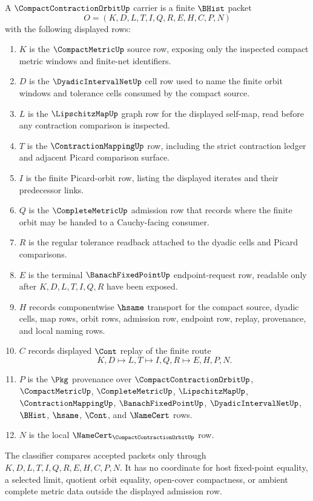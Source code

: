 \begin{definition}
\label{def:compact-contraction-orbit-carrier}
A $\CompactContractionOrbitUp$ carrier is a finite $\BHist$ packet
$$
O=(K,D,L,T,I,Q,R,E,H,C,P,N)
$$
with the following displayed rows:
\begin{enumerate}
\item $K$ is the $\CompactMetricUp$ source row, exposing only the inspected compact metric windows and finite-net identifiers.
\item $D$ is the $\DyadicIntervalNetUp$ cell row used to name the finite orbit windows and tolerance cells consumed by the compact source.
\item $L$ is the $\LipschitzMapUp$ graph row for the displayed self-map, read before any contraction comparison is inspected.
\item $T$ is the $\ContractionMappingUp$ row, including the strict contraction ledger and adjacent Picard comparison surface.
\item $I$ is the finite Picard-orbit row, listing the displayed iterates and their predecessor links.
\item $Q$ is the $\CompleteMetricUp$ admission row that records where the finite orbit may be handed to a Cauchy-facing consumer.
\item $R$ is the regular tolerance readback attached to the dyadic cells and Picard comparisons.
\item $E$ is the terminal $\BanachFixedPointUp$ endpoint-request row, readable only after $K,D,L,T,I,Q,R$ have been exposed.
\item $H$ records componentwise $\hsame$ transport for the compact source, dyadic cells, map rows, orbit rows, admission row, endpoint row, replay, provenance, and local naming rows.
\item $C$ records displayed $\Cont$ replay of the finite route
$$
K,D \longmapsto L,T \longmapsto I,Q,R \longmapsto E,H,P,N .
$$
\item $P$ is the $\Pkg$ provenance over $\CompactContractionOrbitUp$, $\CompactMetricUp$, $\CompleteMetricUp$, $\LipschitzMapUp$, $\ContractionMappingUp$, $\BanachFixedPointUp$, $\DyadicIntervalNetUp$, $\BHist$, $\hsame$, $\Cont$, and $\NameCert$ rows.
\item $N$ is the local $\NameCert_{\CompactContractionOrbitUp}$ row.
\end{enumerate}
The classifier compares accepted packets only through $K,D,L,T,I,Q,R,E,H,C,P,N$. It has no coordinate for host fixed-point equality, a selected limit, quotient orbit equality, open-cover compactness, or ambient complete metric data outside the displayed admission row.
\end{definition}

